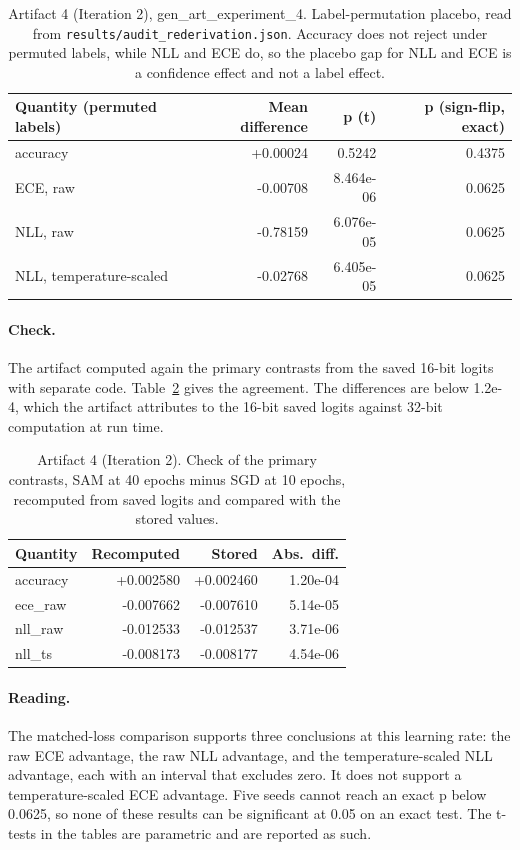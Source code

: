 \documentclass[11pt,letterpaper]{article}
\begin{document}
\begin{table}[!htbp]
\centering
\scriptsize
\caption{Artifact 4 (Iteration 2), gen\_art\_experiment\_4. Label-permutation placebo, read from \texttt{results/audit\_rederivation.json}. Accuracy does not reject under permuted labels, while NLL and ECE do, so the placebo gap for NLL and ECE is a confidence effect and not a label effect.}
\label{tab:perm4}
\begin{tabular}{lrrr}
\toprule
Quantity (permuted labels) & Mean difference & p (t) & p (sign-flip, exact) \\
\midrule
accuracy & +0.00024 & 0.5242 & 0.4375 \\
ECE, raw & -0.00708 & 8.464e-06 & 0.0625 \\
NLL, raw & -0.78159 & 6.076e-05 & 0.0625 \\
NLL, temperature-scaled & -0.02768 & 6.405e-05 & 0.0625 \\
\bottomrule
\end{tabular}
\end{table}
\paragraph{Check.} The artifact computed again the primary contrasts from the saved 16-bit logits with separate code. Table~\ref{tab:check4} gives the agreement. The differences are below 1.2e-4, which the artifact attributes to the 16-bit saved logits against 32-bit computation at run time.

\begin{table}[!htbp]
\centering
\footnotesize
\caption{Artifact 4 (Iteration 2). Check of the primary contrasts, SAM at 40 epochs minus SGD at 10 epochs, recomputed from saved logits and compared with the stored values.}
\label{tab:check4}
\begin{tabular}{lrrr}
\toprule
Quantity & Recomputed & Stored & Abs.\ diff. \\
\midrule
accuracy & +0.002580 & +0.002460 & 1.20e-04 \\
ece\_raw & -0.007662 & -0.007610 & 5.14e-05 \\
nll\_raw & -0.012533 & -0.012537 & 3.71e-06 \\
nll\_ts & -0.008173 & -0.008177 & 4.54e-06 \\
\bottomrule
\end{tabular}
\end{table}

\paragraph{Reading.} The matched-loss comparison supports three conclusions at this learning rate: the raw ECE advantage, the raw NLL advantage, and the temperature-scaled NLL advantage, each with an interval that excludes zero. It does not support a temperature-scaled ECE advantage. Five seeds cannot reach an exact p below 0.0625, so none of these results can be significant at 0.05 on an exact test. The t-tests in the tables are parametric and are reported as such.
\end{document}
